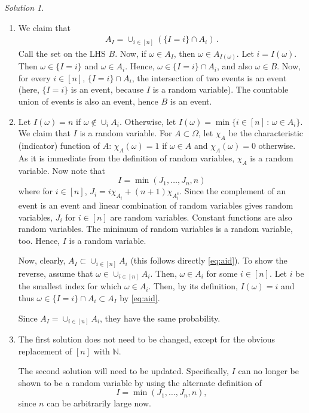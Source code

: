 \documentclass{article}
\DeclareMathOperator*{\1}{\mathbbm{1}}
\newcommand{\0}{\mathbf{0}}
\theoremstyle{definition}
\theoremstyle{remark}
\newtheorem*{solution*}{Solution}
\begin{document}
\begin{solution*}
\mbox{}

\begin{enumerate}
\item
We claim that 
\begin{align}
A_I = \cup_{i\in [n]} (\{ I=i \} \cap A_i)\,.
\label{eq:aid}
\end{align}
Call the set on the LHS $B$.
Now, if $\omega\in A_I$, then $\omega\in A_{I(\omega)}$. Let $i=I(\omega)$. 
Then $\omega \in \{I=i\}$ and $\omega \in A_i$. Hence, $\omega \in \{I=i\} \cap A_i$, and also $\omega \in B$.
Now, for every $i\in [n]$, $\{I=i\} \cap A_i$, the intersection of two events is an event (here, $\{I=i\}$ is an event, because $I$ is a random variable). The countable union of events is also an event, hence $B$ is an event.
\item 
Let $I(\omega) = n$ if $\omega\not\in \cup_i A_i$. Otherwise, let $I(\omega) = \min\{ i\in [n]\,:\, \omega\in A_i \}$. We claim that $I$ is a random variable.
For $A\subset \Omega$, let $\chi_A$ be the characteristic (indicator) function of $A$: $\chi_A(\omega)=1$ if $\omega\in A$ and $\chi_A(\omega)=0$ otherwise.
As it is immediate from the definition of random variables, $\chi_A$ is a random variable.
Now note that 
$$
I = \min( J_1,\dots,J_n, n)
$$
where for $i\in [n]$,  $J_i = i \chi_{A_i} + (n+1) \chi_{A_i^c}$. Since the complement of an event is an event and linear combination of random variables gives random variables, $J_i$ for $i\in [n]$ are random variables. Constant functions are also random variables. The minimum of random variables is a random variable, too. Hence, $I$ is a random variable.

Now, clearly, $A_I \subset \cup_{i\in [n]} A_i$ (this follows directly \eqref{eq:aid}).
To show the reverse, assume that $\omega \in \cup_{i\in [n]} A_i$. Then, $\omega\in A_i$ for some $i\in [n]$. Let $i$ be the smallest index for which $\omega\in A_i$. Then, by its definition, $I(\omega)=i$ and thus $\omega \in \{I=i\} \cap A_i \subset A_I$ by \eqref{eq:aid}.

Since $A_I = \cup_{i\in [n]} A_i$, they have the same probability.

\item 
  The first solution does not need to be changed, except for the obvious replacement of $[n]$ with $\mathbb{N}$.

  The second solution will need to be updated. Specifically, $I$ can no longer be shown to be a random variable by using the alternate definition of  
  $$
  I = \min( J_1,\dots,J_n, n),
  $$
  since $n$ can be arbitrarily large now.


\end{enumerate}
\end{solution*}
\end{document}
